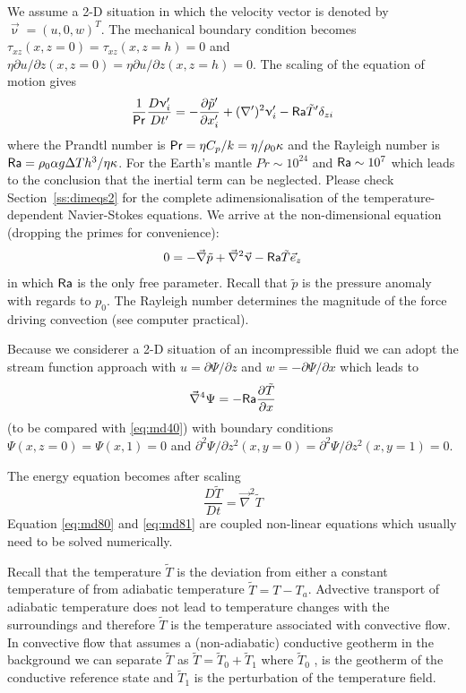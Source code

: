We assume a 2-D situation in which the velocity vector is denoted by
$\vec\upnu=(u,0,w)^T$. The mechanical boundary condition becomes
$\tau_{xz}(x,z=0)=\tau_{xz}(x,z=h)=0$ and 
$\eta \partial u/\partial z (x,z=0) = \eta \partial u/\partial z (x,z=h) = 0$.
The scaling of the equation of motion gives
\begin{equation}
\frac{1}{{\mathsf{Pr}}} \frac{D\upnu_i'}{Dt'} = -\frac{\partial {\tilde p}'}{\partial x_i'}
+(\nabla')^2 \upnu_i' - {\mathsf{Ra}} {\tilde T}' \delta_{zi}
\label{eq:md78}
\end{equation}
where the Prandtl number is ${\mathsf{Pr}}=\eta C_p/k= \eta/\rho_0 \kappa$ and the 
Rayleigh number is ${\mathsf{Ra}}=\rho_0 \alpha g \Delta T h^3 / \eta \kappa$.
For the Earth's mantle $Pr \sim 10^{24}$ and ${\mathsf{Ra}}\sim 10^7$ 
which leads to the conclusion that the inertial
term can be neglected. 
Please check Section~\ref{ss:dimeqs2} for the complete adimensionalisation of the 
temperature-dependent Navier-Stokes equations.
We arrive at the non-dimensional equation (dropping the primes
for convenience):
\begin{equation}
0 = -\vec\nabla {\tilde p} + \vec\nabla^2 \vec\upnu - {\mathsf{Ra}} {\tilde T} \vec{e}_z
\label{eq:md79}
\end{equation}
in which ${\mathsf{Ra}}$ is the only free parameter. Recall that ${\tilde p}$ 
is the pressure anomaly with regards to $p_0$. 
The Rayleigh number determines the magnitude of the force driving convection (see computer 
practical).

Because we considerer a 2-D situation of an incompressible fluid we can adopt the stream
function approach with $u=\partial \Psi/\partial z$ and $w=-\partial \Psi/\partial x$ which 
leads to
\begin{equation}
\vec\nabla^4 \Psi = -{\mathsf{Ra}} \frac{\partial {\tilde T}}{\partial x}
\label{eq:md80}
\end{equation}
(to be compared with \eqref{eq:md40}) with boundary conditions $\Psi(x,z=0)=\Psi(x,1)=0$
and $\partial^2 \Psi/\partial z^2 (x,y=0)=\partial^2 \Psi/\partial z^2 (x,y=1)=0$.

The energy equation becomes after scaling
\begin{equation}
\frac{D{\tilde T}}{Dt} = \vec\nabla^2 {\tilde T}
\label{eq:md81}
\end{equation}
Equation \eqref{eq:md80} and \eqref{eq:md81} are coupled non-linear equations
which usually need to be solved numerically.



Recall that the temperature ${\tilde T}$ 
is the deviation from either a constant temperature of from
adiabatic temperature ${\tilde T} = T-T_a$. 
Advective transport of adiabatic temperature does not
lead to temperature changes with the surroundings and therefore  ${\tilde T}$ is the temperature
associated with convective flow. In convective flow that assumes a (non-adiabatic)
conductive geotherm in the background we can separate ${\tilde T}$ 
as  ${\tilde T}={\tilde T_0}+{\tilde T_1}$ 
where  ${\tilde T}_0$ , is the geotherm of the conductive reference state and 
 ${\tilde T}_1$ is the perturbation of the temperature field.

